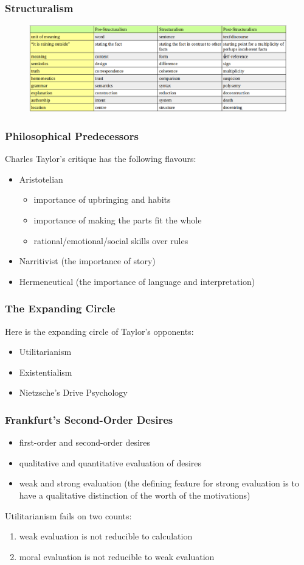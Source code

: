 \documentclass[xcolor=dvipsnames]{beamer}
\begin{document}
\begin{frame}
  \frametitle{Structuralism}
\begin{figure}[h]
\includegraphics[scale=.3]{./structable.png}
\end{figure}
\end{frame}

\begin{frame}
  \frametitle{Philosophical Predecessors}
  Charles Taylor's critique has the following flavours:
  \begin{itemize}
  \item Aristotelian
    \begin{itemize}
    \item importance of upbringing and habits
    \item importance of making the parts fit the whole
    \item rational/emotional/social skills over rules
    \end{itemize}
  \item Narritivist (the importance of story)
  \item Hermeneutical (the importance of language and interpretation)
  \end{itemize}
\end{frame}

\begin{frame}
  \frametitle{The Expanding Circle}
Here is the expanding circle of Taylor's opponents:
\begin{itemize}
\item Utilitarianism
\item Existentialism
\item Nietzsche's Drive Psychology
\end{itemize}
\end{frame}

\begin{frame}
  \frametitle{Frankfurt's Second-Order Desires}
  \begin{itemize}
  \item first-order and second-order desires
  \item qualitative and quantitative evaluation of desires
  \item weak and strong evaluation (the defining feature for strong
    evaluation is to have a qualitative distinction of the worth of
    the motivations)
  \end{itemize}
Utilitarianism fails on two counts:
\begin{enumerate}
\item weak evaluation is not reducible to calculation
\item moral evaluation is not reducible to weak evaluation
\end{enumerate}
\end{frame}
\end{document}
